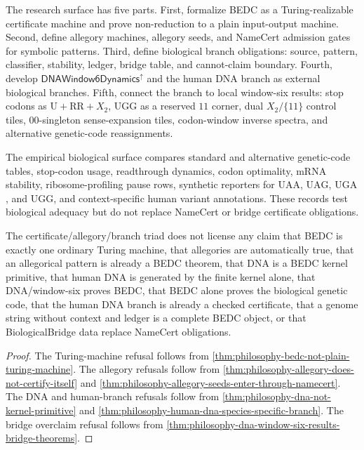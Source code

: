 \begin{definition}
\label{def:philosophy-certificate-allegory-branch-research-surface}
The research surface has five parts. First, formalize BEDC as a
Turing-realizable certificate machine and prove non-reduction to a plain
input-output machine. Second, define allegory machines, allegory seeds,
and NameCert admission gates for symbolic patterns. Third, define
biological branch obligations: source, pattern, classifier, stability,
ledger, bridge table, and cannot-claim boundary. Fourth, develop
$\mathsf{DNAWindow6Dynamics}^{\uparrow}$ and the human DNA branch as
external biological branches. Fifth, connect the branch to local
window-six results: stop codons as $\mathrm{U}+\mathrm{RR}+X_{2}$,
$\mathrm{UGG}$ as a reserved $11$ corner, dual $X_{2}/\{11\}$ control
tiles, $00$-singleton sense-expansion tiles, codon-window inverse
spectra, and alternative genetic-code reassignments.
\end{definition}

\begin{definition}
\label{def:philosophy-certificate-allegory-branch-empirical-surface}
The empirical biological surface compares standard and alternative
genetic-code tables, stop-codon usage, readthrough dynamics, codon
optimality, mRNA stability, ribosome-profiling pause rows, synthetic
reporters for $\mathrm{UAA}$, $\mathrm{UAG}$, $\mathrm{UGA}$, and
$\mathrm{UGG}$, and context-specific human variant annotations. These
records test biological adequacy but do not replace NameCert or bridge
certificate obligations.
\end{definition}

\begin{theorem}
\label{thm:philosophy-certificate-allegory-branch-cannot-claim}
The certificate/allegory/branch triad does not license any claim that
BEDC is exactly one ordinary Turing machine, that allegories are
automatically true, that an allegorical pattern is already a BEDC
theorem, that DNA is a BEDC kernel primitive, that human DNA is generated
by the finite kernel alone, that DNA/window-six proves BEDC, that BEDC
alone proves the biological genetic code, that the human DNA branch is
already a checked certificate, that a genome string without context and
ledger is a complete BEDC object, or that BiologicalBridge data replace
NameCert obligations.
\end{theorem}
\begin{proof}
The Turing-machine refusal follows from
\autoref{thm:philosophy-bedc-not-plain-turing-machine}. The allegory
refusals follow from
\autoref{thm:philosophy-allegory-does-not-certify-itself} and
\autoref{thm:philosophy-allegory-seeds-enter-through-namecert}. The DNA
and human-branch refusals follow from
\autoref{thm:philosophy-dna-not-kernel-primitive} and
\autoref{thm:philosophy-human-dna-species-specific-branch}. The bridge
overclaim refusal follows from
\autoref{thm:philosophy-dna-window-six-results-bridge-theorems}.
\end{proof}

